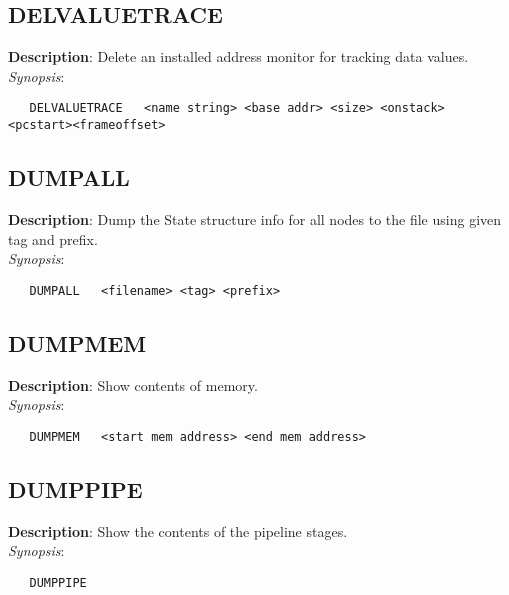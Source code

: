 \subsection{\bf DELVALUETRACE}
\label{manpages:DELVALUETRACE}
\label{manpages:delvaluetrace}
\vspace{-0.2in}
{\bf Description}: 	Delete an installed address monitor for tracking data values.\\[1.5ex]
{\em Synopsis}:
\vspace{-0.2in}
\scriptsize
\begin{verbatim}
   DELVALUETRACE   <name string> <base addr> <size> <onstack> <pcstart><frameoffset>
\end{verbatim}
\normalsize
\vspace{-0.2in}


\subsection{\bf DUMPALL}
\label{manpages:DUMPALL}
\label{manpages:dumpall}
\vspace{-0.2in}
{\bf Description}: 	Dump the State structure info for all nodes to the file using given tag and prefix.\\[1.5ex]
{\em Synopsis}:
\vspace{-0.2in}
\scriptsize
\begin{verbatim}
   DUMPALL   <filename> <tag> <prefix>	
\end{verbatim}
\normalsize
\vspace{-0.2in}


\subsection{\bf DUMPMEM}
\label{manpages:DUMPMEM}
\label{manpages:dumpmem}
\vspace{-0.2in}
{\bf Description}: 	Show contents of memory.\\[1.5ex]
{\em Synopsis}:
\vspace{-0.2in}
\scriptsize
\begin{verbatim}
   DUMPMEM   <start mem address> <end mem address>		
\end{verbatim}
\normalsize
\vspace{-0.2in}


\subsection{\bf DUMPPIPE}
\label{manpages:DUMPPIPE}
\label{manpages:dumppipe}
\vspace{-0.2in}
{\bf Description}: 	Show the contents of the pipeline stages.\\[1.5ex]
{\em Synopsis}:
\vspace{-0.2in}
\scriptsize
\begin{verbatim}
   DUMPPIPE   				
\end{verbatim}
\normalsize
\vspace{-0.2in}


